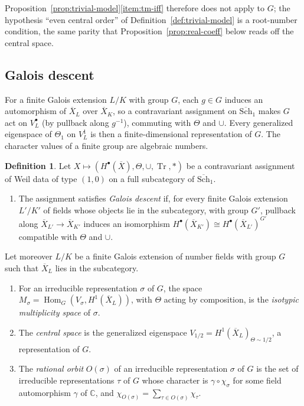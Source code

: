\documentclass[11pt]{amsart}
\theoremstyle{plain}
\theoremstyle{definition}
\newtheorem{definition}[theorem]{Definition}
\theoremstyle{remark}
\numberwithin{equation}{section}
\newcommand{\C}{\mathbb{C}}
\newcommand{\Xbar}{\overline{X}}
\newcommand{\Schbar}{\overline{\mathrm{Sch}}}
\DeclareMathOperator{\Tr}{Tr}
\begin{document}
Proposition~\ref{prop:trivial-model}\ref{item:tm-iff} therefore does
not apply to $G$; the hypothesis ``even central order'' of
Definition~\ref{def:trivial-model} is a root-number condition, the
same parity that Proposition~\ref{prop:real-coeff} below reads off the
central space.
\subsection{Galois descent}\label{subsec:descent}

For a finite Galois extension $L/K$ with group $G$, each $g\in G$
induces an automorphism of $\Xbar_L$ over $\Xbar_K$, so a contravariant
assignment on $\Schbar_1$ makes $G$ act on $V^\bullet_L$ (by pullback along
$g^{-1}$), commuting with $\Theta$ and $\cup$. Every generalized
eigenspace of $\Theta_1$ on $V^1_L$ is then a finite-dimensional
representation of $G$. The character values of a finite group are
algebraic numbers.

\begin{definition}\label{def:descent}
Let $X\mapsto(H^\bullet(\Xbar),\Theta,\cup,\Tr,*)$ be a contravariant
assignment of Weil data of type $(1,0)$ on a full subcategory of
$\Schbar_1$.
\begin{enumerate}[label=(\alph*)]
\item The assignment satisfies \emph{Galois descent} if, for every
  finite Galois extension $L'/K'$ of fields whose objects lie in the
  subcategory, with group $G'$, pullback along $\Xbar_{L'}\to\Xbar_{K'}$
  induces an isomorphism $H^\bullet(\Xbar_{K'})\cong H^\bullet(\Xbar_{L'})^{G'}$
  compatible with $\Theta$ and $\cup$.
\end{enumerate}
Let moreover $L/K$ be a finite Galois extension of number fields with
group $G$ such that $\Xbar_L$ lies in the subcategory.
\begin{enumerate}[label=(\alph*),resume]
\item For an irreducible representation $\sigma$ of $G$, the space
  $M_\sigma=\operatorname{Hom}_G(V_\sigma,H^1(\Xbar_L))$, with $\Theta$ acting
  by composition, is the \emph{isotypic multiplicity space} of
  $\sigma$.
\item The \emph{central space} is the generalized eigenspace
  $V_{1/2}=H^1(\Xbar_L)_{\Theta\sim1/2}$, a representation of $G$.
\item The \emph{rational orbit} $O(\sigma)$ of an irreducible
  representation $\sigma$ of $G$ is the set of irreducible
  representations $\tau$ of $G$ whose character is
  $\gamma\circ\chi_\sigma$ for some field automorphism $\gamma$ of $\C$,
  and $\chi_{O(\sigma)}=\sum_{\tau\in O(\sigma)}\chi_\tau$.
\end{enumerate}
\end{definition}
\end{document}
